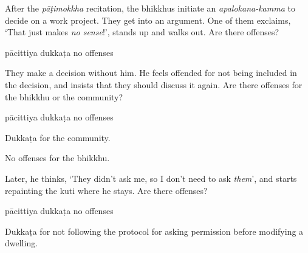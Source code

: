 \begin{exam}{\autoExamName}
  \begin{problem*}

    \begin{parts}

      \item After the \textit{pāṭimokkha} recitation, the bhikkhus initiate an
      \emph{apalokana-kamma} to decide on a work project. They get into an
      argument. One of them exclaims, `That just makes \textit{no sense}!',
      stands up and walks out. Are there offenses?

      \bigskip

      \begin{answers}{3}
        \bChoices
         pācittiya\eAns
         dukkaṭa\eAns
         no offenses\eAns
        \eChoices
      \end{answers}

      \clearpage

    \item They make a decision without him. He feels offended for not being
      included in the decision, and insists that they should discuss it again.
      Are there offenses for the bhikkhu or the community?

      \bigskip

      \begin{answers}{3}
        \bChoices
         pācittiya\eAns
         dukkaṭa\eAns
         no offenses\eAns
        \eChoices
      \end{answers}

      \begin{solution}
        Dukkaṭa for the community.

        No offenses for the bhikkhu.
      \end{solution}

      \bigskip
  
    \item Later, he thinks, `They didn't ask me, so I don't need to ask
      \textit{them}', and starts repainting the kuti where he stays.
      Are there offenses?

      \bigskip

      \begin{answers}{3}
        \bChoices
         pācittiya\eAns
         dukkaṭa\eAns
         no offenses\eAns
        \eChoices
      \end{answers}

      \begin{solution}
        Dukkaṭa for not following the protocol for asking permission before
        modifying a dwelling.
      \end{solution}

    \end{parts}

  \end{problem*}

\end{exam}
